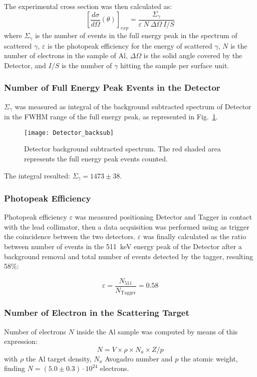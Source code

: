The experimental cross section was then calculated as:
\begin{equation*}
	\left[\frac{d\sigma}{d\Omega}(\theta)\right]_{exp}=\frac{\Sigma_\gamma}{\varepsilon\ N\ \Delta\Omega\ I/S}
\end{equation*}
 where $\Sigma_\gamma$ is the number of events in the full energy peak in the spectrum of scattered $\gamma$, $\varepsilon$ is the photopeak efficiency for the energy of scattered  $\gamma$, $N$ is the number of electrons in the sample of Al, $\Delta\Omega$ is the solid angle covered by the Detector, and $I/S$ is the number of $\gamma$ hitting the sample per  surface unit. 
 
\subsubsection*{Number of Full Energy Peak Events in the Detector}
 
 $\Sigma_\gamma$ was measured as integral of the background subtracted spectrum of Detector in the FWHM range of the full energy peak, as represented in Fig.~\ref{Fig:Detector_backsub}. 
\begin{figure}[h!]
	\centering
	\texttt{[image: Detector\_backsub]}
	\caption{Detector background subtracted spectrum. The red shaded area represents the full energy peak events counted.}
	\label{Fig:Detector_backsub}
\end{figure}

The integral resulted: $\Sigma_\gamma = 1473 \pm 38$.
 
\subsubsection*{Photopeak Efficiency}
Photopeak efficiency $\varepsilon$ was measured positioning Detector and Tagger in contact with the lead collimator, then a data acquisition was performed using as trigger the coincidence between the two detectors.
 $\varepsilon$ was finally calculated as the ratio between number of events in the 511~keV energy peak of the Detector after a background removal and total number of events detected by the tagger, resulting 58\%:

\begin{equation*}
\varepsilon = \dfrac{N_{511}}{N_{\text{Tagger}}} = 0.58
\end{equation*} 
 
 \subsubsection*{Number of Electron in the Scattering Target}
 Number of electrons $N$ inside the Al sample was computed by means of this expression:
\[
N=V\times \rho\times N_a\times Z/p
\]
with $\rho$ the Al target density, $N_a$ Avogadro number and $p$  the atomic weight, finding $N=(5.0 \pm 0.3)\cdot10^{24}$ electrons.

